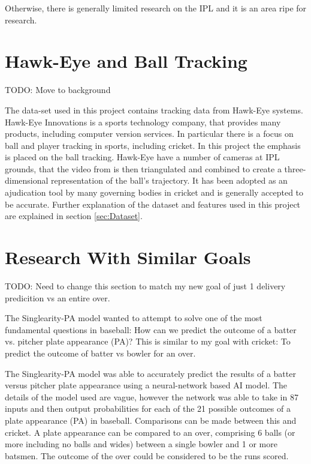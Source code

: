 \documentclass[12pt,a4paper]{report}
\theoremstyle{definition}
\begin{document}
Otherwise, there is generally limited research on the IPL and it is an area ripe for research.

\section{Hawk-Eye and Ball Tracking}

TODO: Move to background

The data-set used in this project contains tracking data from Hawk-Eye systems.
Hawk-Eye Innovations is a sports technology company, that provides many products, including computer version services.
In particular there is a focus on ball and player tracking in sports, including cricket.
In this project the emphasis is placed on the ball tracking.
Hawk-Eye have a number of cameras at IPL grounds, that the video from is then triangulated and combined to create a three-dimensional representation of the ball's trajectory.
It has been adopted as an ajudication tool by many governing bodies in cricket and is generally accepted to be accurate.
Further explanation of the dataset and features used in this project are explained in section \ref{sec:Dataset}.

\section{Research With Similar Goals}

TODO: Need to change this section to match my new goal of just 1 delivery predicition vs an entire over.

The Singlearity-PA model \citep{silver2021baseball} wanted to attempt to solve one of the most fundamental questions in baseball:	 How can we	predict the outcome of a batter	vs. pitcher plate appearance (PA)? 
This is similar to my goal with cricket:  To predict the outcome of batter vs bowler for an over.

The Singlearity-PA model \citep{silver2021baseball} was able to accurately predict the results of a batter versus pitcher plate appearance using a neural-network based AI model. 
The details of the model used are vague, however the network was able to take in 87 inputs and then output probabilities for each of the 21 possible outcomes of a plate appearance (PA) in baseball. 
Comparisons can be made between this and cricket. 
A plate appearance can be compared to an over, comprising 6 balls (or more including no balls and wides) between a single bowler and 1 or more batsmen. 
The outcome of the over could be considered to be the runs scored. 
\end{document}
